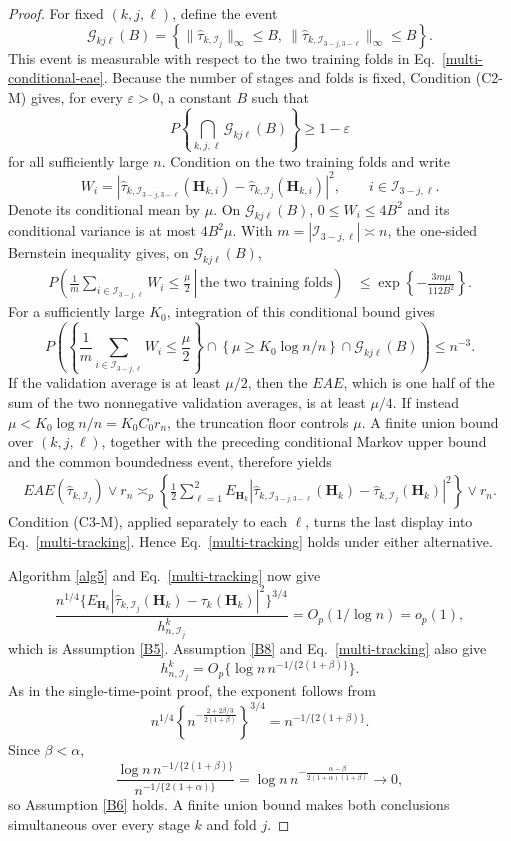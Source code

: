 \documentclass[11pt]{article}
\theoremstyle{referenceplain}
\theoremstyle{referencedefinition}
\theoremstyle{referenceremark}
\begin{document}
\begin{proof}
For fixed $(k,j,\ell)$, define the event
\[
\mathcal G_{kj\ell}(B)=
\left\{\|\widehat\tau_{k,\mathcal I_j}\|_\infty\le B,
\ \|\widehat\tau_{k,\mathcal I_{3-j,3-\ell}}\|_\infty\le B\right\}.
\]
This event is measurable with respect to the two training folds in Eq.~\eqref{multi-conditional-eae}. Because the number of stages and folds is fixed, Condition (C2-M) gives, for every $\varepsilon>0$, a constant $B$ such that
\[
P\left\{\bigcap_{k,j,\ell}\mathcal G_{kj\ell}(B)\right\}\ge1-\varepsilon
\]
for all sufficiently large $n$. Condition on the two training folds and write
\[
W_i=|\widehat\tau_{k,\mathcal I_{3-j,3-\ell}}(\mathbf H_{k,i})
-\widehat\tau_{k,\mathcal I_j}(\mathbf H_{k,i})|^2,
\qquad i\in\mathcal I_{3-j,\ell}.
\]
Denote its conditional mean by $\mu$. On $\mathcal G_{kj\ell}(B)$, $0\le W_i\le4B^2$ and its conditional variance is at most $4B^2\mu$. With $m=|\mathcal I_{3-j,\ell}|\asymp n$, the one-sided Bernstein inequality gives, on $\mathcal G_{kj\ell}(B)$,
\begin{align*}
P\left(\left.
\frac1m\sum_{i\in\mathcal I_{3-j,\ell}}W_i
\le\frac\mu2\,\right|\,\text{the two training folds}\right)
&\le\exp\left\{-\frac{3m\mu}{112B^2}\right\}.
\end{align*}
For a sufficiently large $K_0$, integration of this conditional bound gives
\[
P\left(\left\{\frac1m\sum_{i\in\mathcal I_{3-j,\ell}}W_i\le\frac\mu2\right\}
\cap\left\{\mu\ge K_0\log n/n\right\}\cap\mathcal G_{kj\ell}(B)\right)\le n^{-3}.
\]
If the validation average is at least $\mu/2$, then the $EAE$, which is one half of the sum of the two nonnegative validation averages, is at least $\mu/4$. If instead $\mu<K_0\log n/n=K_0{C_0} r_n$, the truncation floor controls $\mu$. A finite union bound over $(k,j,\ell)$, together with the preceding conditional Markov upper bound and the common boundedness event, therefore yields
\begin{align*}
EAE(\widehat\tau_{k,\mathcal I_j})\vee r_n
\asymp_p
\left\{\frac12\sum_{\ell=1}^2
E_{\mathbf H_k}|\widehat\tau_{k,\mathcal I_{3-j,3-\ell}}(\mathbf H_k)
-\widehat\tau_{k,\mathcal I_j}(\mathbf H_k)|^2\right\}\vee r_n.
\end{align*}
Condition (C3-M), applied separately to each $\ell$, turns the last display into Eq.~\eqref{multi-tracking}. Hence Eq.~\eqref{multi-tracking} holds under either alternative.

Algorithm \ref{alg5} and Eq.~\eqref{multi-tracking} now give
\[
\frac{n^{1/4}\{E_{\mathbf H_k}|\widehat\tau_{k,\mathcal I_j}(\mathbf H_k)-\tau_k(\mathbf H_k)|^2\}^{3/4}}
{h_{n,\mathcal I_j}^{k}}
=O_p(1/\log n)=o_p(1),
\]
which is Assumption \ref{B5}. Assumption \ref{B8} and Eq.~\eqref{multi-tracking} also give
\[
h_{n,\mathcal I_j}^{k}=O_p\{\log n\,n^{-1/\{2(1+\beta)\}}\}.
\]
As in the single-time-point proof, the exponent follows from
\[
n^{1/4}
\left\{n^{-\frac{2+2\beta/3}{2(1+\beta)}}\right\}^{3/4}
=n^{-1/\{2(1+\beta)\}}.
\]
Since $\beta<\alpha$,
\[
\frac{\log n\,n^{-1/\{2(1+\beta)\}}}{n^{-1/\{2(1+\alpha)\}}}
=\log n\,n^{-\frac{\alpha-\beta}{2(1+\alpha)(1+\beta)}}\longrightarrow0,
\]
so Assumption \ref{B6} holds. A finite union bound makes both conclusions simultaneous over every stage $k$ and fold $j$.
\end{proof}
\end{document}
